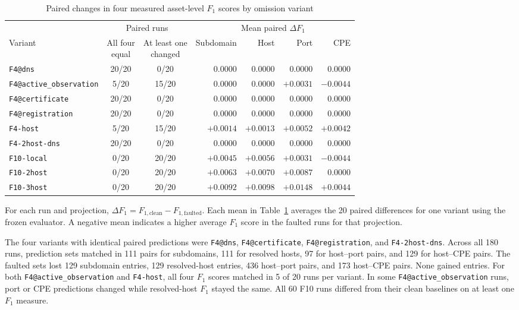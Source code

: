 \documentclass[sn-basic]{sn-jnl}%
\theoremstyle{thmstyleone}%
\theoremstyle{thmstyletwo}%
\theoremstyle{thmstylethree}%
\begin{document}
\begin{table}[htbp]
\centering
\caption{Paired changes in four measured asset-level \(F_1\) scores by omission variant}
\label{tab:paired-f1-changes}
\small
\setlength{\tabcolsep}{3pt}
\renewcommand{\arraystretch}{1.1}
\begin{tabular*}{\linewidth}{@{\extracolsep{\fill}}lccrrrr@{}}
\toprule
& \multicolumn{2}{c}{Paired runs}
& \multicolumn{4}{c}{Mean paired \(\Delta F_1\)} \\
\cmidrule(lr){2-3}\cmidrule(l){4-7}
Variant
& \shortstack{All four\\equal}
& \shortstack{At least one\\changed}
& Subdomain & Host & Port & CPE \\
\midrule
\texttt{F4@dns}
  & 20/20 & 0/20  & \(0.0000\)  & \(0.0000\)  & \(0.0000\)  & \(0.0000\)  \\
\texttt{F4@active\_observation}
  & 5/20  & 15/20 & \(0.0000\)  & \(0.0000\)  & \(+0.0031\) & \(-0.0044\) \\
\texttt{F4@certificate}
  & 20/20 & 0/20  & \(0.0000\)  & \(0.0000\)  & \(0.0000\)  & \(0.0000\)  \\
\texttt{F4@registration}
  & 20/20 & 0/20  & \(0.0000\)  & \(0.0000\)  & \(0.0000\)  & \(0.0000\)  \\
\texttt{F4-host}
  & 5/20  & 15/20 & \(+0.0014\) & \(+0.0013\) & \(+0.0052\) & \(+0.0042\) \\
\texttt{F4-2host-dns}
  & 20/20 & 0/20  & \(0.0000\)  & \(0.0000\)  & \(0.0000\)  & \(0.0000\)  \\
\addlinespace
\texttt{F10-local}
  & 0/20  & 20/20 & \(+0.0045\) & \(+0.0056\) & \(+0.0031\) & \(-0.0044\) \\
\texttt{F10-2host}
  & 0/20  & 20/20 & \(+0.0063\) & \(+0.0070\) & \(+0.0087\) & \(0.0000\)  \\
\texttt{F10-3host}
  & 0/20  & 20/20 & \(+0.0092\) & \(+0.0098\) & \(+0.0148\) & \(+0.0044\) \\
\bottomrule
\end{tabular*}
\end{table}

For each run and projection, \(\Delta F_1 = F_{1,\mathrm{clean}} - F_{1,\mathrm{faulted}}\). Each mean in Table~\ref{tab:paired-f1-changes} averages the 20 paired differences for one variant using the frozen evaluator. A negative mean indicates a higher average \(F_1\) score in the faulted runs for that projection.

The four variants with identical paired predictions were \texttt{F4@dns}, \texttt{F4@certificate}, \texttt{F4@registration}, and \texttt{F4-2host-dns}. Across all 180 runs, prediction sets matched in 111 pairs for subdomains, 111 for resolved hosts, 97 for host--port pairs, and 129 for host--CPE pairs. The faulted sets lost 129 subdomain entries, 129 resolved-host entries, 436 host--port pairs, and 173 host--CPE pairs. None gained entries. For both \texttt{F4@active\_observation} and \texttt{F4-host}, all four \(F_1\) scores matched in 5 of 20 runs per variant. In some \texttt{F4@active\_observation} runs, port or CPE predictions changed while resolved-host \(F_1\) stayed the same. All 60 F10 runs differed from their clean baselines on at least one \(F_1\) measure.
\end{document}
